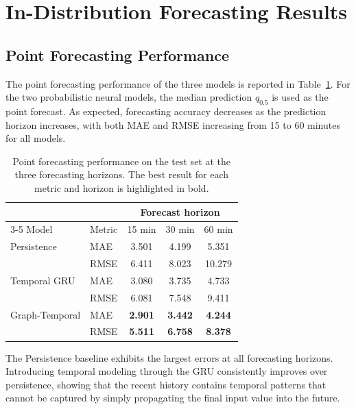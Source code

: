 \section{In-Distribution Forecasting Results}
\label{sec:in_distribution_results}


\subsection{Point Forecasting Performance}
\label{subsec:point_results}

The point forecasting performance of the three models is reported in
Table~\ref{tab:point_results}. For the two probabilistic neural models, the
median prediction $q_{0.5}$ is used as the point forecast. As expected,
forecasting accuracy decreases as the prediction horizon increases, with
both MAE and RMSE increasing from 15 to 60 minutes for all models.

\begin{table}[t]
    \centering
    \caption{Point forecasting performance on the test set at the three
    forecasting horizons. The best result for each metric and horizon is
    highlighted in bold.}
    \label{tab:point_results}
    \begin{tabular}{llccc}
        \toprule
        & & \multicolumn{3}{c}{Forecast horizon} \\
        \cmidrule(lr){3-5}
        Model & Metric & 15 min & 30 min & 60 min \\
        \midrule

        Persistence
        & MAE  & 3.501 & 4.199 & 5.351 \\
        & RMSE & 6.411 & 8.023 & 10.279 \\
        \midrule

        Temporal GRU
        & MAE  & 3.080 & 3.735 & 4.733 \\
        & RMSE & 6.081 & 7.548 & 9.411 \\
        \midrule

        Graph-Temporal
        & MAE  & \textbf{2.901} & \textbf{3.442} & \textbf{4.244} \\
        & RMSE & \textbf{5.511} & \textbf{6.758} & \textbf{8.378} \\
        \bottomrule
    \end{tabular}
\end{table}

The Persistence baseline exhibits the largest errors at all forecasting
horizons. Introducing temporal modeling through the GRU consistently improves
over persistence, showing that the recent history contains temporal patterns
that cannot be captured by simply propagating the final input value into the
future.

